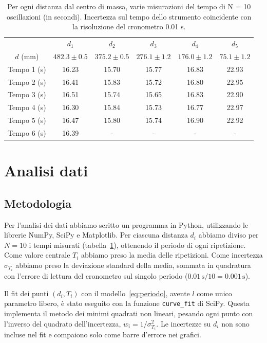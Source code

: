 \documentclass[a4paper]{article}
\begin{document}
\begin{table}[H]
    \centering
    \small
    \begin{tabular}{c|c|c|c|c|c}
      & $d_1$ & $d_2$ & $d_3$ & $d_4$ & $d_5$ \\
      $d$ (mm) & $482.3 \pm 0.5$ & $375.2 \pm 0.5$ & $276.1 \pm 1.2$ & $176.0 \pm 1.2$ & $75.1 \pm 1.2$ \\
      \hline
      Tempo 1 (s) & 16.23 & 15.70 & 15.77 & 16.83 & 22.93 \\
      Tempo 2 (s) & 16.41 & 15.83 & 15.72 & 16.80 & 22.95 \\
      Tempo 3 (s) & 16.51 & 15.74 & 15.65 & 16.83 & 22.90 \\
      Tempo 4 (s) & 16.30 & 15.84 & 15.73 & 16.77 & 22.97 \\
      Tempo 5 (s) & 16.47 & 15.80 & 15.74 & 16.90 & 22.92 \\
      Tempo 6 (s) & 16.39 & - & - & - & - \\
    \end{tabular}
    \caption{Per ogni distanza dal centro di massa, varie misurazioni del tempo di N = 10 oscillazioni (in secondi). Incertezza sul tempo dello strumento coincidente con la risoluzione del cronometro 0.01 s.}
    \label{tab:misure}
\end{table}

\newpage

\section{Analisi dati}\label{sec:analisi}


\subsection{Metodologia}\label{sec:metodologia}
Per l'analisi dei dati abbiamo scritto un programma in Python, utilizzando
le librerie NumPy, SciPy e Matplotlib. Per ciascuna distanza $d_i$ abbiamo
diviso per $N = 10$ i tempi misurati (tabella~\ref{tab:misure}), ottenendo il periodo di ogni
ripetizione. Come valore centrale $T_i$ abbiamo preso la media delle
ripetizioni. Come incertezza $\sigma_{T_i}$ abbiamo preso la deviazione
standard della media, sommata in quadratura con l'errore di lettura del
cronometro sul singolo periodo
($0.01\,\mathrm{s}/10 = 0.001\,\mathrm{s}$).

Il fit dei punti $(d_i, T_i)$ con il modello~\eqref{eq:periodo}, avente $l$
come unico parametro libero, è stato eseguito con la funzione
\texttt{curve\_fit} di SciPy. Questa implementa il metodo dei minimi
quadrati non lineari, pesando ogni punto con l'inverso del quadrato
dell'incertezza, $w_i = 1/\sigma_{T_i}^2$. Le incertezze su $d_i$ non sono incluse nel fit e compaiono
solo come barre d'errore nei grafici.
\end{document}
